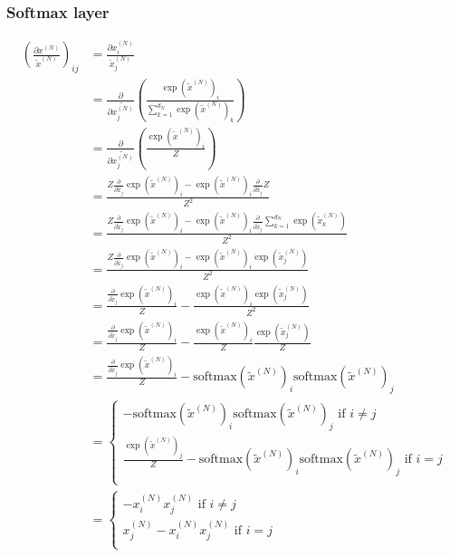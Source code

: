 \documentclass{article}
\begin{document}
\subsubsection*{Softmax layer}


\begin{align}
\left(\frac{\partial x^{(N)}}{\tilde{x}^{(N)}}\right)_{ij}
&= \frac{\partial x^{(N)}_i}{\tilde{x}^{(N)}_j}\\
&=
\frac{\partial}{\partial\tilde{x^{(N)}_j}}\left(
\frac{\exp(\tilde{x}^{(N)})_i}{\sum_{k=1}^{d_N} \exp(\tilde{x}^{(N)})_k}
\right)\\
&=
\frac{\partial}{\partial\tilde{x^{(N)}_j}}\left(
\frac{\exp(\tilde{x}^{(N)})_i}{Z}
\right)\\
&=
\frac{Z\frac{\partial}{\partial\tilde{x}_j}\exp(\tilde{x}^{(N)})_i-\exp(\tilde{x}^{(N)})_i\frac{\partial}{\partial\tilde{x}_j}Z}{Z^2}\\
&=
\frac{Z\frac{\partial}{\partial\tilde{x}_j}\exp(\tilde{x}^{(N)})_i-\exp(\tilde{x}^{(N)})_i\frac{\partial}{\partial\tilde{x}_j}\sum_{k=1}^{d_N} \exp(\tilde{x}^{(N)}_k)}{Z^2}\\
&=
\frac{Z\frac{\partial}{\partial\tilde{x}_j}\exp(\tilde{x}^{(N)})_i-\exp(\tilde{x}^{(N)})_i \exp(\tilde{x}^{(N)}_j)}{Z^2}\\
&=
\frac{\frac{\partial}{\partial\tilde{x}_j}\exp(\tilde{x}^{(N)})_i}{Z}-\frac{\exp(\tilde{x}^{(N)})_i \exp(\tilde{x}^{(N)}_j)}{Z^2}\\
&=
\frac{\frac{\partial}{\partial\tilde{x}_j}\exp(\tilde{x}^{(N)})_i}{Z}-\frac{\exp(\tilde{x}^{(N)})_i}{Z}\frac{\exp(\tilde{x}^{(N)}_j)}{Z}\\
&=
\frac{\frac{\partial}{\partial\tilde{x}_j}\exp(\tilde{x}^{(N)})_i}{Z}-\text{softmax}(\tilde{x}^{(N)})_i\text{softmax}(\tilde{x}^{(N)})_j\\
&=
\left\lbrace
\begin{matrix}
-\text{softmax}(\tilde{x}^{(N)})_i\text{softmax}(\tilde{x}^{(N)})_j \text{ if } i\neq j\\
\frac{\exp(\tilde{x}^{(N)})_j}{Z}-\text{softmax}(\tilde{x}^{(N)})_i\text{softmax}(\tilde{x}^{(N)})_j\text{ if } i = j\\
\end{matrix}
\right. \\
&=
\left\lbrace
\begin{matrix}
-x^{(N)}_i x^{(N)}_j \text{ if } i\neq j\\
x^{(N)}_j-x^{(N)}_i x^{(N)}_j\text{ if } i = j\\
\end{matrix}
\right. \\
\end{align}
\end{document}
